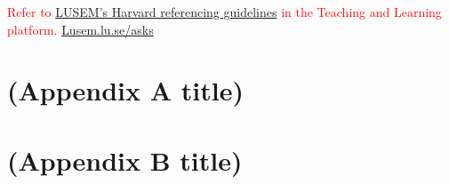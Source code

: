 \documentclass[12pt,twoside]{report}
\newcommand{\mcite}[1]{\textcolor{mycolor}{\citeauthor{#1} (\citeyear{#1})}}
\newcommand{\hcite}[1]{(\textcolor{mycolor}{\citeauthor{#1}, \citeyear{#1}})}
\begin{document}
    
    
    \vspace{2.0cm}
    \textcolor{red}{Refer to \href{http://libguides.lub.lu.se/plagiarism}{LUSEM’s Harvard referencing guidelines} in the Teaching and Learning platform. \url{Lusem.lu.se/asks}}

    \appendix
    \chapter{(Appendix A title)}
    
    
     \chapter{(Appendix B title)}
    
\end{document}
